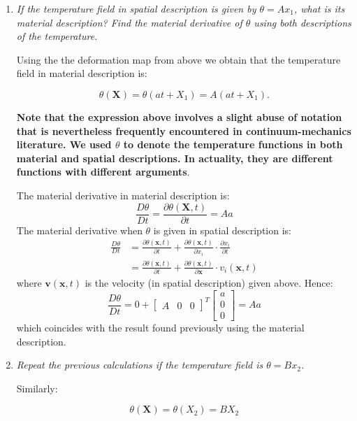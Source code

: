 \documentclass{article}
\newcommand{\ee}{\end{equation}}
\newcommand{\be}{\begin{equation}}
\newcommand{\pa}{\partial}
\newcommand{\bs}{\boldsymbol}
\begin{document}
\begin{enumerate}
\item  {\em If the temperature field in spatial description is given by $\theta=Ax_1$, what is its material description? Find the material derivative of
$\theta$ using both descriptions of the temperature.}

Using the the deformation map from above we obtain that the temperature field in material description is:

\be
\theta(\bs{X})=\theta(at+X_1)=A(at+X_1).
\ee


\textbf{Note that the expression above involves a slight abuse of notation that is nevertheless frequently encountered in continuum-mechanics literature. We
used $\theta$ to denote the temperature functions in both material and spatial descriptions. In actuality, they are different functions with different arguments}.


The material derivative in material description is:
\be
\frac{D \theta}{D t}=\frac{\pa \theta(\bs{X},t)}{\pa t}=Aa
\ee
The material derivative when $\theta$ is given in spatial description is:
\be
\begin{array}{ll}
\frac{D \theta}{D t}&=\frac{\pa \theta(\bs{x},t)}{\pa t}+\frac{\pa \theta(\bs{x},t)}{\pa  x_i} \cdot \frac{\pa x_i}{\pa t} \\
& = \frac{\pa \theta(\bs{x},t)}{\pa t}+\frac{\pa \theta(\bs{x},t)}{\pa \bs{x}} \cdot v_i(\bs{x},t)
\end{array}
\ee
where $\bs{v}(\bs{x},t)$ is the velocity (in spatial description) given above.
Hence:
\be
\frac{D \theta}{D t}=0+\left[\begin{array}{lll}  A & 0 & 0 \end{array} \right]^T \left[\begin{array}{l}  a \\ 0 \\ 0 \end{array} \right]=Aa
\ee
which coincides with the result found previously using the material description.

\item {\em  Repeat the previous calculations if the temperature field is $\theta=Bx_2$.}

Similarly:

\be
\theta(\bs{X})=\theta(X_2)=BX_2
\ee





\end{enumerate}
\end{document}
